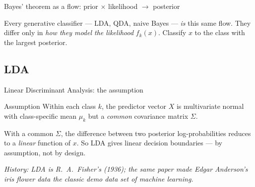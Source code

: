 \documentclass[aspectratio=169,11pt]{beamer}
\begin{document}
\begin{frame}{Bayes' theorem as a flow: prior $\times$ likelihood $\to$ posterior}
  \begin{center}
  \end{center}
  \begin{takeaway}
    Every generative classifier --- LDA, QDA, naive Bayes --- \emph{is}
    this same flow. They differ only in \emph{how they model the
    likelihood} $f_k(x)$. Classify $x$ to the class with the largest
    posterior.
  \end{takeaway}
\end{frame}

\subsection{LDA}

\begin{frame}{Linear Discriminant Analysis: the assumption}\label{frm:ldaassume}
  \begin{block}{Assumption}
    Within each class $k$, the predictor vector $X$ is multivariate
    normal with class-specific mean $\mu_k$ but a \emph{common}
    covariance matrix $\Sigma$.
  \end{block}
  \begin{takeaway}
    With a common $\Sigma$, the difference between two posterior
    log-probabilities reduces to a \emph{linear} function of $x$. So
    LDA gives linear decision boundaries --- by assumption, not by
    design.
  \end{takeaway}
  \par{\tiny\itshape\color{gray}History: LDA is R.~A.\ Fisher's (1936); the
  same paper made Edgar Anderson's iris flower data the classic demo data set
  of machine learning.}
\end{frame}
\end{document}
